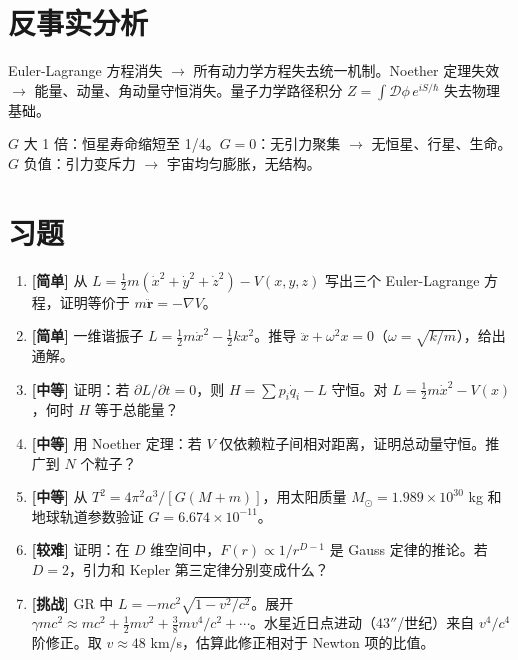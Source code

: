 \section*{反事实分析}

\begin{limitbox}[若无最小作用量原理]
  Euler-Lagrange 方程消失 $\to$ 所有动力学方程失去统一机制。Noether 定理失效 $\to$ 能量、动量、角动量守恒消失。量子力学路径积分 $Z = \int \mathcal{D}\phi\, e^{iS/\hbar}$ 失去物理基础。
\end{limitbox}

\begin{limitbox}[若 G 的值不同]
  $G$ 大 1 倍：恒星寿命缩短至 1/4。$G=0$：无引力聚集 $\to$ 无恒星、行星、生命。$G$ 负值：引力变斥力 $\to$ 宇宙均匀膨胀，无结构。
\end{limitbox}

\section*{习题}

\begin{enumerate}
  \item \textbf{[简单]} 从 $L = \frac{1}{2}m(\dot{x}^2 + \dot{y}^2 + \dot{z}^2) - V(x,y,z)$ 写出三个 Euler-Lagrange 方程，证明等价于 $m\ddot{\mathbf{r}} = -\nabla V$。
  \item \textbf{[简单]} 一维谐振子 $L = \frac{1}{2}m\dot{x}^2 - \frac{1}{2}kx^2$。推导 $\ddot{x} + \omega^2 x = 0$（$\omega = \sqrt{k/m}$），给出通解。
  \item \textbf{[中等]} 证明：若 $\partial L/\partial t = 0$，则 $H = \sum p_i \dot{q}_i - L$ 守恒。对 $L = \frac{1}{2}m\dot{x}^2 - V(x)$，何时 $H$ 等于总能量？
  \item \textbf{[中等]} 用 Noether 定理：若 $V$ 仅依赖粒子间相对距离，证明总动量守恒。推广到 $N$ 个粒子？
  \item \textbf{[中等]} 从 $T^2 = 4\pi^2 a^3/[G(M+m)]$，用太阳质量 $M_\odot = 1.989\times10^{30}$ kg 和地球轨道参数验证 $G = 6.674\times10^{-11}$。
  \item \textbf{[较难]} 证明：在 $D$ 维空间中，$F(r) \propto 1/r^{D-1}$ 是 Gauss 定律的推论。若 $D=2$，引力和 Kepler 第三定律分别变成什么？
  \item \textbf{[挑战]} GR 中 $L = -mc^2\sqrt{1-v^2/c^2}$。展开 $\gamma mc^2 \approx mc^2 + \frac{1}{2}mv^2 + \frac{3}{8}mv^4/c^2 + \cdots$。水星近日点进动（$43''$/世纪）来自 $v^4/c^4$ 阶修正。取 $v \approx 48$ km/s，估算此修正相对于 Newton 项的比值。
\end{enumerate}
